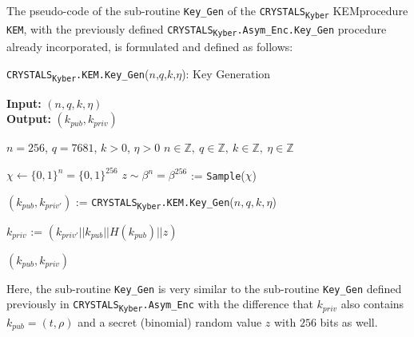 \documentclass[runningheads]{llncs}
\numberwithin{equation}{section}
\begin{document}
    \noindent The pseudo-code of the sub-routine \texttt{Key\_Gen} of the \texorpdfstring{\texttt{CRYSTALS}\textsubscript{\texttt{Kyber}}}\/ KEM\break procedure \texttt{KEM}, with the previously defined \texorpdfstring{\texttt{CRYSTALS}\textsubscript{\texttt{Kyber}}\texttt{.Asym\_Enc}\texttt{.Key\_Gen}}\/ procedure already incorporated, is formulated and defined as follows:
    \vspace{-2.75ex}
    \setcounter{algorithm}{5}
    \begin{algorithm}
        \caption{\texorpdfstring{\texttt{CRYSTALS}\textsubscript{\texttt{Kyber}}\texttt{.KEM}\texttt{.Key\_Gen}($n$,$q$,$k$,$\eta$)}\/: Key Generation}
        \label{subrou:crystals-kyber-kem-key-gen}
        
        \textbf{Input:} $\left( n, q, k, \eta \right)$\\
        \textbf{Output:} $\left( {k}_{pub}, {k}_{priv} \right)$
        
        \begin{algorithmic}[1]
            \Require $n = 256$, $q = 7681$, $k > 0$, $\eta > 0$
            \Ensure $n \in \mathbb{Z},\ q \in \mathbb{Z},\ k \in \mathbb{Z},\ \eta \in \mathbb{Z}$
        
            \vspace{2ex}

            \State $\chi \gets {\{0,1\}}^{n} = {\{0,1\}}^{256}$
            \State $z \sim {\beta}^{n} = {\beta}^{256}$ := \texttt{Sample}($\chi$)
            
            \vspace{1ex}
            
            \State $({k}_{pub},{k}_{priv'})$ := \texttt{CRYSTALS}\textsubscript{\texttt{Kyber}}\texttt{.KEM}\texttt{.Key\_Gen}($n,q,k,\eta$)
            
            \vspace{1ex}

            \State ${k}_{priv}$ := $({k}_{priv'}||{k}_{pub}||H({k}_{pub})||z)$
            
            \vspace{1ex}
            
            \State \Return $\left( {k}_{pub}, {k}_{priv} \right)$
        \end{algorithmic}
    \end{algorithm}
    \vspace{-2ex}

    \noindent Here, the sub-routine \texttt{Key\_Gen} is very similar to the sub-routine \texttt{Key\_Gen} defined previously in \texorpdfstring{\texttt{CRYSTALS}\textsubscript{\texttt{Kyber}}\texttt{.Asym\_Enc}}, with the difference that ${k}_{priv}$ also contains ${k}_{pub} = (t, \rho)$ and a secret (binomial) random value $z$ with $256$ bits as well.
\end{document}
